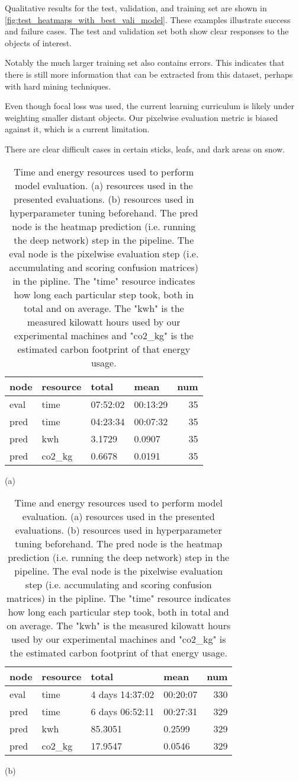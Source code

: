 \documentclass[10pt,twocolumn,letterpaper]{article}
\begin{document}
Qualitative results for the test, validation, and training set are shown in
\cref{fig:test_heatmaps_with_best_vali_model}. These examples illustrate
success and failure cases. The test and validation set both show clear
responses to the objects of interest. 

Notably the much larger training set also contains errors. This indicates that
there is still more information that can be extracted from this dataset,
perhaps with hard mining techniques.

Even though focal loss was used, the current learning curriculum is likely
under weighting smaller distant objects. Our pixelwise evaluation metric is
biased against it, which is a current limitation.

There are clear difficult cases in certain sticks, leafs, and dark areas on
snow.



\begin{table}[t]
    \centering
\begin{tabular}{llllr}
\toprule
        node & resource &           total &            mean &  num \\
\midrule
eval & time & 07:52:02 &  00:13:29 &   35 \\
pred & time & 04:23:34 &  00:07:32 &   35 \\
pred &      kwh &        3.1729&        0.0907&   35 \\
pred &   co2\_kg &        0.6678&         0.0191 &   35 \\
\bottomrule
\end{tabular}

(a)

\begin{tabular}{llllr}
\toprule
        node & resource &           total &            mean &  num \\
\midrule
eval & time & 4 days 14:37:02 & 00:20:07 &  330 \\
pred & time & 6 days 06:52:11 & 00:27:31 &  329 \\
pred &      kwh &       85.3051&        0.2599 &  329 \\
pred &   co2\_kg &       17.9547&        0.0546 &  329 \\
\bottomrule
\end{tabular}

(b)

\label{tab:resources}
\caption[]{
Time and energy resources used to perform model evaluation.
(a) resources used in the presented evaluations.
(b) resources used in hyperparameter tuning beforehand.
The pred node is the heatmap prediction (i.e. running the deep network) step in
the pipeline.  The eval node is the pixelwise evaluation step (i.e.
accumulating and scoring confusion matrices) in the pipline. 
The "time" resource indicates how long each particular step took, both in total
and on average. The "kwh" is the measured kilowatt hours used by our
experimental machines and "co2\_kg" is the estimated carbon footprint of that
energy usage. 
}
\end{table}
\end{document}

